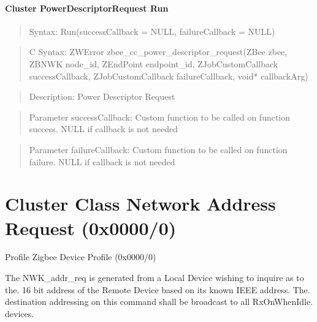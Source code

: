 \paragraph{Cluster PowerDescriptorRequest Run}
\begin{quote}Syntax: Run(successCallback = NULL, failureCallback = NULL)\end{quote}
\begin{quote}C Syntax: ZWError zbee\_cc\_power\_descriptor\_request(ZBee zbee, ZBNWK node\_id, ZEndPoint endpoint\_id, ZJobCustomCallback successCallback, ZJobCustomCallback failureCallback, void* callbackArg)\end{quote}
\begin{quote}Description: Power Descriptor Request\end{quote}
\begin{quote}Parameter successCallback: Custom function to be called on function success. NULL if callback is not needed\end{quote}
\begin{quote}Parameter failureCallback: Custom function to be called on function failure. NULL if callback is not needed\end{quote}



\section{Cluster Class Network Address Request (0x0000/0)}

Profile Zigbee Device Profile (0x0000/0)

The NWK\_addr\_req is generated from a Local Device wishing to inquire as to the. 16 bit address of the Remote Device based on its known IEEE address. The. destination addressing on this command shall be broadcast to all RxOnWhenIdle. devices.
